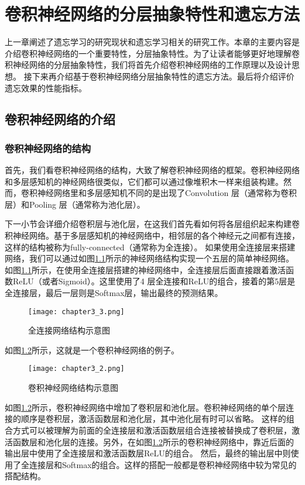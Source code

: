 
\chapter{卷积神经网络的分层抽象特性和遗忘方法}
上一章阐述了遗忘学习的研究现状和遗忘学习相关的研究工作。本章的主要内容是介绍卷积神经网络的一个重要特性，分层抽象特性。为了让读者能够更好地理解卷积神经网络的分层抽象特性，我们将首先介绍卷积神经网络的工作原理以及设计思想。
接下来再介绍基于卷积神经网络分层抽象特性的遗忘方法。最后将介绍评价遗忘效果的性能指标。

\section{卷积神经网络的介绍}

\subsection{卷积神经网络的结构}

首先，我们看卷积神经网络的结构，大致了解卷积神经网络的框架。卷积神经网络和多层感知机的神经网络很类似，它们都可以通过像堆积木一样来组装构建。然而，卷积神经网络里和多层感知机不同的是出现了Convolution 层（通常称为卷积层）和Pooling 层（通常称为池化层）。

下一小节会详细介绍卷积层与池化层，在这我们首先看如何将各层组织起来构建卷积神经网络。基于多层感知机的神经网络中，相邻层的各个神经元之间都有连接，这样的结构被称为fully-connected（通常称为全连接）。
如果使用全连接层来搭建网络，我们可以通过如图\ref{fig:chapter3_3}所示的神经网络结构实现一个五层的简单神经网络。
如图\ref{fig:chapter3_3}所示，在使用全连接层搭建的神经网络中，全连接层后面直接跟着激活函数ReLU（或者Sigmoid）。这里使用了4 层全连接和ReLU的组合，接着的第5层是全连接层，最后一层则是Softmax层，输出最终的预测结果。
\begin{figure}
    \centering
    \texttt{[image: chapter3\_3.png]}
    \caption{全连接网络结构示意图\cite{luyujie_202}}
    \label{fig:chapter3_3}
\end{figure}
如图\ref{fig:chapter3_2}所示，这就是一个卷积神经网络的例子。
\begin{figure}
    \centering
    \texttt{[image: chapter3\_2.png]}
    \caption{卷积神经网络结构示意图\cite{luyujie_202}}
    \label{fig:chapter3_2}
\end{figure}

如图\ref{fig:chapter3_2}所示，卷积神经网络中增加了卷积层和池化层。卷积神经网络的单个层连接的顺序是卷积层，激活函数层和池化层，其中池化层有时可以省略。
这样的组合方式可以被理解为前面的全连接层和激活函数层组合连接被替换成了卷积层，激活函数层和池化层的连接。另外，在如图\ref{fig:chapter3_2}所示的卷积神经网络中，靠近后面的输出层中使用了全连接层和激活函数层ReLU的组合。
然后，最终的输出层中则使用了全连接层和Softmax的组合。这样的搭配一般都是卷积神经网络中较为常见的搭配结构。

